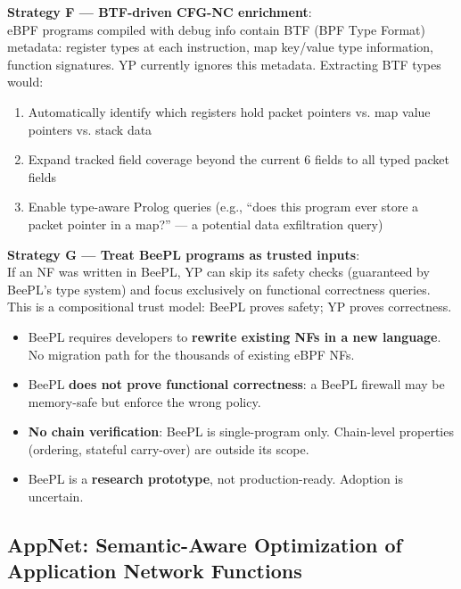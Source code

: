 \begin{strategybox}
\textbf{Strategy F --- BTF-driven CFG-NC enrichment}:\\
eBPF programs compiled with debug info contain BTF (BPF Type Format) metadata: register types at each instruction, map key/value type information, function signatures. YP currently ignores this metadata. Extracting BTF types would:
\begin{enumerate}
  \item Automatically identify which registers hold packet pointers vs. map value pointers vs. stack data
  \item Expand tracked field coverage beyond the current 6 fields to all typed packet fields
  \item Enable type-aware Prolog queries (e.g., ``does this program ever store a packet pointer in a map?'' --- a potential data exfiltration query)
\end{enumerate}

\textbf{Strategy G --- Treat BeePL programs as trusted inputs}:\\
If an NF was written in BeePL, YP can skip its safety checks (guaranteed by BeePL's type system) and focus exclusively on functional correctness queries. This is a compositional trust model: BeePL proves safety; YP proves correctness.
\end{strategybox}

\begin{limitbox}
\begin{itemize}
  \item BeePL requires developers to \textbf{rewrite existing NFs in a new language}. No migration path for the thousands of existing eBPF NFs.
  \item BeePL \textbf{does not prove functional correctness}: a BeePL firewall may be memory-safe but enforce the wrong policy.
  \item \textbf{No chain verification}: BeePL is single-program only. Chain-level properties (ordering, stateful carry-over) are outside its scope.
  \item BeePL is a \textbf{research prototype}, not production-ready. Adoption is uncertain.
\end{itemize}
\end{limitbox}

\subsection{AppNet: Semantic-Aware Optimization of Application Network Functions}

